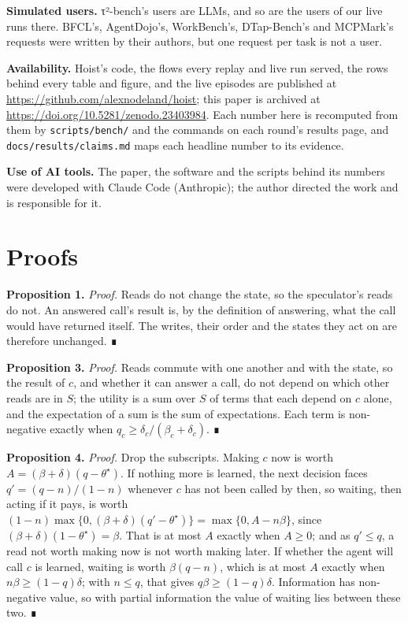\documentclass[10pt,twocolumn,letterpaper]{article}
\newcommand{\runin}[1]{{\sffamily\bfseries\color{accent}#1}}
\begin{document}
\runin{Simulated users.} τ²-bench's users are LLMs, and so are the users of our live runs there. BFCL's, AgentDojo's, WorkBench's, DTap-Bench's and MCPMark's requests were written by their authors, but one request per task is not a user.

\runin{Availability.} Hoist's code, the flows every replay and live run served, the rows behind every table and figure, and the live episodes are published at \url{https://github.com/alexnodeland/hoist}; this paper is archived at \url{https://doi.org/10.5281/zenodo.23403984}. Each number here is recomputed from them by \texttt{scripts/bench/} and the commands on each round's results page, and \texttt{docs/results/claims.md} maps each headline number to its evidence.

\runin{Use of AI tools.} The paper, the software and the scripts behind its numbers were developed with Claude Code (Anthropic); the author directed the work and is responsible for it.





\appendix

\section{Proofs}\label{proofs}

\runin{Proposition 1.} \emph{Proof.} Reads do not change the state, so the speculator's reads do not. An answered call's result is, by the definition of answering, what the call would have returned itself. The writes, their order and the states they act on are therefore unchanged. ∎

\runin{Proposition 3.} \emph{Proof.} Reads commute with one another and with the state, so the result of \(c\), and whether it can answer a call, do not depend on which other reads are in \(S\); the utility is a sum over \(S\) of terms that each depend on \(c\) alone, and the expectation of a sum is the sum of expectations. Each term is non-negative exactly when \(q_c \ge \delta_c/(\beta_c+\delta_c)\). ∎

\runin{Proposition 4.} \emph{Proof.} Drop the subscripts. Making \(c\) now is worth \(A = (\beta+\delta)(q-\theta^\star)\). If nothing more is learned, the next decision faces \(q' = (q-n)/(1-n)\) whenever \(c\) has not been called by then, so waiting, then acting if it pays, is worth \((1-n)\max\{0,(\beta+\delta)(q'-\theta^\star)\} = \max\{0, A-n\beta\}\), since \((\beta+\delta)(1-\theta^\star) = \beta\). That is at most \(A\) exactly when \(A \ge 0\); and as \(q' \le q\), a read not worth making now is not worth making later. If whether the agent will call \(c\) is learned, waiting is worth \(\beta(q-n)\), which is at most \(A\) exactly when \(n\beta \ge (1-q)\delta\); with \(n \le q\), that gives \(q\beta \ge (1-q)\delta\). Information has non-negative value, so with partial information the value of waiting lies between these two. ∎
\end{document}
